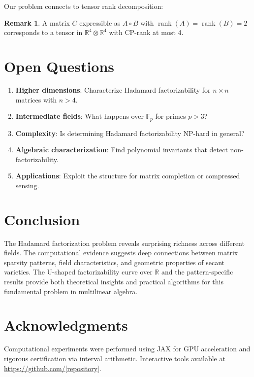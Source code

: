 \documentclass{article}
\theoremstyle{definition}
\newtheorem{remark}[theorem]{Remark}
\DeclareMathOperator{\rank}{rank}
\begin{document}
Our problem connects to tensor rank decomposition:

\begin{remark}
A matrix $C$ expressible as $A \circ B$ with $\rank(A) = \rank(B) = 2$ corresponds to a tensor in $\mathbb{R}^4 \otimes \mathbb{R}^4$ with CP-rank at most 4.
\end{remark}

\section{Open Questions}

\begin{enumerate}
\item \textbf{Higher dimensions}: Characterize Hadamard factorizability for $n \times n$ matrices with $n > 4$.

\item \textbf{Intermediate fields}: What happens over $\mathbb{F}_p$ for primes $p > 3$?

\item \textbf{Complexity}: Is determining Hadamard factorizability NP-hard in general?

\item \textbf{Algebraic characterization}: Find polynomial invariants that detect non-factorizability.

\item \textbf{Applications}: Exploit the structure for matrix completion or compressed sensing.
\end{enumerate}

\section{Conclusion}

The Hadamard factorization problem reveals surprising richness across different fields. The computational evidence suggests deep connections between matrix sparsity patterns, field characteristics, and geometric properties of secant varieties. The U-shaped factorizability curve over $\mathbb{R}$ and the pattern-specific results provide both theoretical insights and practical algorithms for this fundamental problem in multilinear algebra.

\section*{Acknowledgments}

Computational experiments were performed using JAX for GPU acceleration and rigorous certification via interval arithmetic. Interactive tools available at \url{https://github.com/[repository]}.



\end{document}
